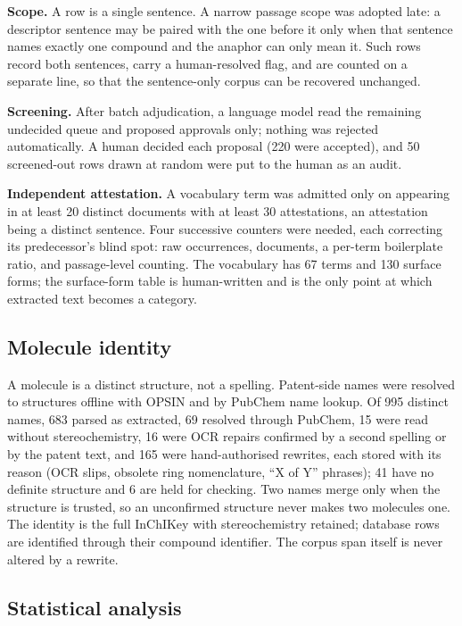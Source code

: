 \documentclass[
  computerscience
]{genesisl1-paper}
\begin{document}
\textbf{Scope.} A row is a single sentence. A narrow passage scope was adopted late: a
descriptor sentence may be paired with the one before it only when that sentence names
exactly one compound and the anaphor can only mean it. Such rows record both sentences,
carry a human-resolved flag, and are counted on a separate line, so that the
sentence-only corpus can be recovered unchanged.

\textbf{Screening.} After batch adjudication, a language model read the remaining
undecided queue and proposed approvals only; nothing was rejected automatically. A human
decided each proposal (220 were accepted), and 50 screened-out rows drawn at random
were put to the human as an audit.

\textbf{Independent attestation.} A vocabulary term was admitted only on appearing in
at least 20 distinct documents with at least 30 attestations, an attestation being a
distinct sentence. Four successive counters were needed, each correcting its
predecessor's blind spot: raw occurrences, documents, a per-term boilerplate ratio, and
passage-level counting. The vocabulary has 67 terms and 130 surface forms; the
surface-form table is human-written and is the only point at which extracted text
becomes a category.

\subsection{Molecule identity}

A molecule is a distinct structure, not a spelling. Patent-side names were resolved to
structures offline with OPSIN and by PubChem name lookup. Of 995 distinct names, 683
parsed as extracted, 69 resolved through PubChem, 15 were read without stereochemistry,
16 were OCR repairs confirmed by a second spelling or by the patent text, and 165 were hand-authorised
rewrites, each stored with its reason (OCR slips, obsolete ring nomenclature,
``X of Y'' phrases); 41 have no definite structure and 6 are held for checking. Two
names merge only when the structure is trusted, so an unconfirmed structure never makes
two molecules one. The identity is the full InChIKey with stereochemistry retained;
database rows are identified through their compound identifier. The corpus span itself
is never altered by a rewrite.

\subsection{Statistical analysis}
\end{document}
